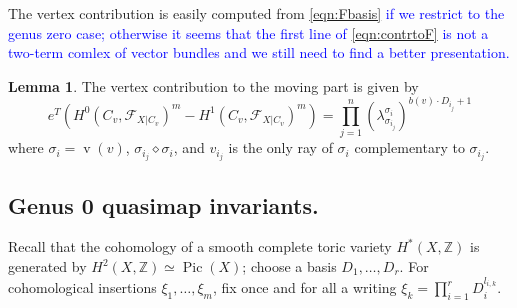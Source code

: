 \documentclass[11pt]{amsart}
\newcommand{\F}{\mathcal F}
\newcommand{\Pic}{\operatorname{Pic}}
\newcommand{\ZZ}{\mathbb{Z}}
\newcommand{\vv}{\operatorname{v}}
\theoremstyle{definition}
\newtheorem{lem}[thm]{Lemma}
\theoremstyle{definition}
\begin{document}
The vertex contribution is easily computed from \eqref{eqn:Fbasis} \textcolor{blue}{if we restrict to the genus zero case; otherwise it seems that the first line of \eqref{eqn:contrtoF} is not a two-term comlex of vector bundles and we still need to find a better presentation.}

\begin{lem}
 The vertex contribution to the moving part is given by
 \[
  e^T(H^0(C_v,\F_{X|C_v})^m-H^1(C_v,\F_{X|C_v})^m)=\prod_{j=1}^n(\lambda^{\sigma_i}_{\sigma_{i_j}})^{b(v)\cdot D_{i_j}+1}
 \]
\noindent where $\sigma_i=\vv(v)$, $\sigma_{i_j}\diamond\sigma_i$, and $v_{i_j}$ is the only ray of $\sigma_i$ complementary to $\sigma_{i_j}$.
\end{lem}

\subsection{Genus 0 quasimap invariants.} Recall that the cohomology of a smooth complete toric variety $H^*(X,\ZZ)$ is generated by $H^2(X,\ZZ)\simeq\Pic(X)$; choose a basis $D_1,\ldots,D_r$. For cohomological insertions $\xi_1,\ldots,\xi_m$, fix once and for all a writing $\xi_k=\prod_{i=1}^r D_i^{l_{i,k}}$.
\end{document}
